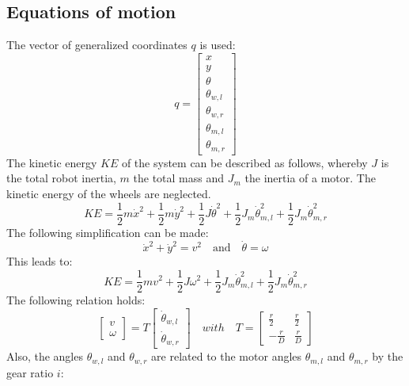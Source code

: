 \documentclass[a4paper, 11pt]{article}
\begin{document}
\subsection{Equations of motion}
The vector of generalized coordinates $q$ is used:
\begin{equation}
	q = 
	\begin{bmatrix}
	x\\ y\\ \theta\\ \theta_{w,l} \\ \theta_{w,r}\\ \theta_{m,l} \\ \theta_{m,r}
	\end{bmatrix}
\end{equation}
The kinetic energy $KE$ of the system can be described as follows, whereby $J$ is the total robot inertia, $m$ the total mass and $J_m$ the inertia of a motor. The kinetic energy of the wheels are neglected.
\begin{equation}
	KE = \frac{1}{2}m\dot{x}^2 + \frac{1}{2}m\dot{y}^2 + \frac{1}{2}J\dot{\theta}^2 +\frac{1}{2}J_m\dot{\theta}_{m,l}^2 + \frac{1}{2}J_m\dot{\theta}_{m,r}^2
\end{equation}
The following simplification can be made:
\begin{equation}
	\dot{x}^2 + \dot{y}^2 = v^2 \quad \textrm{and} \quad \dot{\theta} = \omega
\end{equation}
This leads to:
\begin{equation}
KE = \frac{1}{2}mv^2 + \frac{1}{2}J\omega^2 +\frac{1}{2}J_m\dot{\theta}_{m,l}^2 + \frac{1}{2}J_m\dot{\theta}_{m,r}^2
\end{equation}
The following relation holds:
\begin{equation}
\begin{bmatrix}
v\\
\omega
\end{bmatrix}
= T
\begin{bmatrix}
\dot{\theta}_{w,l}\\
\dot{\theta}_{w,r}
\end{bmatrix}
\quad with \quad
T = 
\begin{bmatrix}
\frac{r}{2} &\frac{r}{2}\\[4pt] 
-\frac{r}{D} &\frac{r}{D}
\end{bmatrix}
\label{eq:T}
\end{equation}
Also, the angles $\theta_{w,l}$ and $\theta_{w,r}$ are related to the motor angles $\theta_{m,l}$ and $\theta_{m,r}$ by the gear ratio $i$:
\end{document}

